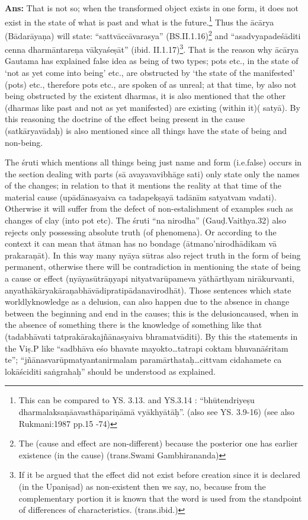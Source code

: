 \textbf{Ans:} That is not so; when the transformed object exists in one form, it does not exist in the state of what is past and what is the future.\footnote{This can be compared to YS. 3.13. and YS.3.14 : “bhūtendriyeṣu dharmalaksaṇāavasthāpariṇāmā vyākhyātāḥ”. (also see YS. 3.9-16) (see also Rukmani:1987 pp.15 -74)} Thus the ācārya (Bādarāyaṇa) will state: “sattvāccāvarasya” (BS.II.1.16)\footnote{The (cause and effect are non-different) because the posterior one has earlier existence (in the cause) (trans.Swami Gambhirananda)} and “asadvyapadeśāditi cenna dharmāntareṇa vākyaśeṣāt” (ibid. II.1.17)\footnote{If it be argued that the effect did not exist before creation since it is declared (in the Upaniṣad) as non-existent then we say, no, because from the complementary portion it is known that the word is used from the standpoint of differences of characteristics. (trans.ibid.)}. That is the reason why ācārya Gautama has explained false idea as being of two types; pots etc., in the state of ‘not as yet come into being’ etc., are obstructed by ‘the state of  the manifested’ (pots) etc., therefore pots etc., are spoken of as unreal; at that time, by also not being obstructed by the existent dharmas, it is also mentioned  that the other (dharmas like past and not as yet manifested) are existing (within it)( satyā). By this reasoning the doctrine of the effect being present in the cause (satkāryavādaḥ) is also mentioned since all things have the state of being and non-being. 

The śruti which mentions all things being just name and form (i.e.false) occurs in the section dealing with parts (sā avayavavibhāge sati) only state only the names of the changes; in relation to that it mentions the reality at that time of the material cause (upādānasyaiva ca tadape\-kṣayā tadānīm satyatvam vadati). Otherwise it will suffer from the defect of non-estalishment of examples such as changes of clay (into pot etc). The śruti “na nirodha” (Gauḍ.Vaithya.32) also rejects only possessing absolute truth (of phenomena). Or according to the context it can mean that ātman has no bondage (ātmano’nirodhādikam vā prakaraṇāt). In this way many nyāya sūtras also reject truth in the form of being permanent, otherwise there will be contradiction in mentioning the state of being a cause or effect (nyāyasūtrāṇyapi nityatvarūpameva yāthārthyam nirākurvanti, anyathākāryakāraṇabhāvādipratipādanavirodhāt). Those sentences which state worldly\break knowledge as a delusion, can also happen due to the absence in change between the beginning and end in the causes; this is the delusion\break caused, when in the absence of something there is the knowledge of something like that (tadabhāvati tatprakārakajñānasyaiva bhramatvā\-diti). By this the statements in the Viṣ.P like “sadbhāva eśo bhavate mayokto…tatrapi coktam bhuvanāśritam te”;  “jñānasvarūpmatyanta\-nirmalam paramārthataḥ…cittvam cidahamete ca lokāściditi saṅgrahaḥ” should be understood as explained.

